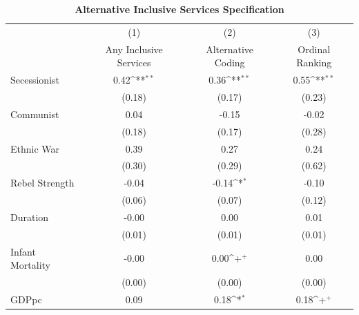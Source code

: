 \documentclass[12pt, letterpaper]{article}
\begin{document}
\newpage
\begin{table}[htbp]\centering
\begin{small}
\def\sym#1{\ifmmode^{#1}\else\(^{#1}\)\fi}
\renewcommand\thetable{A.\Roman{table}}
\makeatletter
\def\myrow{}
\CT@everycr{\noalign{%
\global\let\CT@row@color\relax
\stepcounter{mym10}%
\ifnum\value{mym10}=3
  \gdef\myrow{\rowcolor{gray!50}}
\else\ifnum\value{mym10}=5
  \gdef\myrow{}
\fi\fi
}\myrow}
\caption{\textbf{Alternative Inclusive Services Specification}}
\label{table:altpg}
\begin{tabular}{l*{3}{c}}
\hline\hline
                    &\multicolumn{1}{c}{(1)}&\multicolumn{1}{c}{(2)}&\multicolumn{1}{c}{(3)}\\
                    &\multicolumn{1}{c}{Any Inclusive Services}&\multicolumn{1}{c}{Alternative Coding}&\multicolumn{1}{c}{Ordinal Ranking}\\
\hline
Secessionist      &        0.42\sym{**} &        0.36\sym{**} &        0.55\sym{**} \\
                    &      (0.18)         &      (0.17)         &      (0.23)         \\
Communist           &        0.04         &       -0.15         &       -0.02         \\
                    &      (0.18)         &      (0.17)         &      (0.28)         \\
Ethnic War          &        0.39         &        0.27         &        0.24         \\
                    &      (0.30)         &      (0.29)         &      (0.62)         \\
Rebel Strength      &       -0.04         &       -0.14\sym{*}  &       -0.10         \\
                    &      (0.06)         &      (0.07)         &      (0.12)         \\
Duration            &       -0.00         &        0.00         &        0.01         \\
                    &      (0.01)         &      (0.01)         &      (0.01)         \\
Infant Mortality    &       -0.00         &        0.00\sym{+}  &        0.00         \\
                    &      (0.00)         &      (0.00)         &      (0.00)         \\
GDPpc               &        0.09         &        0.18\sym{*}  &        0.18\sym{+}  \\

\end{tabular}
\end{small}
\end{table}
\end{document}
